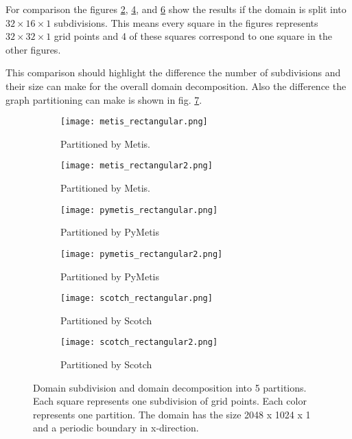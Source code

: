For comparison the figures \ref{fig:metis2}, \ref{fig:pymetis2}, and \ref{fig:scotch2} show the results if the domain is split into $32 \times 16 \times 1$ subdivisions.
This means every square in the figures represents $32 \times 32 \times 1$ grid points and 4 of these squares correspond to one square in the other figures.

This comparison should highlight the difference the number of subdivisions and their size can make for the overall domain decomposition.
Also the difference the graph partitioning can make is shown in fig. \ref{fig:rectangular1}.


\begin{figure}[!htbp]
\centering
\begin{subfigure}{0.6\textwidth}
  \centering
  \texttt{[image: metis\_rectangular.png]}
  \caption{Partitioned by Metis.}
  \label{fig:metis1}
\end{subfigure}%
\begin{subfigure}{0.6\textwidth}
  \centering
  \texttt{[image: metis\_rectangular2.png]}
  \caption{Partitioned by Metis.}
  \label{fig:metis2}
\end{subfigure}

\begin{subfigure}{0.6\textwidth}
  \centering
  \texttt{[image: pymetis\_rectangular.png]}
  \caption{Partitioned by PyMetis}
  \label{fig:pymetis1}
\end{subfigure}%
\begin{subfigure}{0.6\textwidth}
  \centering
  \texttt{[image: pymetis\_rectangular2.png]}
  \caption{Partitioned by PyMetis}
  \label{fig:pymetis2}
\end{subfigure}

\begin{subfigure}{0.6\textwidth}
  \centering
  \texttt{[image: scotch\_rectangular.png]}
  \caption{Partitioned by Scotch}
  \label{fig:scotch1}
\end{subfigure}%
\begin{subfigure}{0.6\textwidth}
  \centering
  \texttt{[image: scotch\_rectangular2.png]}
  \caption{Partitioned by Scotch}
  \label{fig:scotch2}
\end{subfigure}

\caption{Domain subdivision and domain decomposition into 5 partitions. Each square represents one subdivision of grid points. Each color represents one partition. The domain has the size 2048 x 1024 x 1 and a periodic boundary in x-direction.}
\label{fig:rectangular1}
\end{figure}

